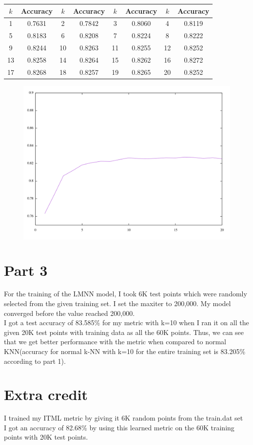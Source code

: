 \documentclass[a4paper,11pt]{article}
\begin{document}
\begin{mlsolution}
\begin{center}
\begin{tabular}{ |c|c|c|c|c|c|c|c| } 
 \hline
 $k$ & Accuracy & $k$ & Accuracy & $k$ & Accuracy & $k$ & Accuracy\\ \hline
 1 & 0.7631 & 2 & 0.7842 & 3 & 0.8060 & 4 & 0.8119 \\ 
 5 & 0.8183 & 6 & 0.8208 & 7 & 0.8224 & 8 & 0.8222 \\
 9 & 0.8244 & 10 & 0.8263 & 11 & 0.8255 & 12 & 0.8252 \\
 13 & 0.8258 & 14 & 0.8264 & 15 & 0.8262 & 16 & 0.8272\\
 17 & 0.8268 & 18 & 0.8257 & 19 & 0.8265 & 20 & 0.8252 \\ 
 \hline
\end{tabular}
\end{center}

\begin{figure}[th]%
\centering
\includegraphics[scale = 0.5]{q62_plot.png}%
\label{fig:proto}%
\end{figure}

\section*{Part 3}
For the training of the LMNN model, I took 6K test points which were randomly selected from the given training set. I set the maxiter to 200,000. My model converged before the value reached 200,000. 
\\I got a test accuracy of 83.585\% for my metric with k=10 when I ran it on all the given 20K test points with training data as all the 60K points. Thus, we can see that we get better performance with the metric when compared to normal KNN(accuracy for normal k-NN with k=10 for the entire training set is 83.205\% according to part 1).

\section*{Extra credit}
I trained my ITML metric by giving it 6K random points from the train.dat set
\\I got an accuracy of 82.68\% by using this learned metric on the 60K training points with 20K test points.

\end{mlsolution}
					
\end{document}
